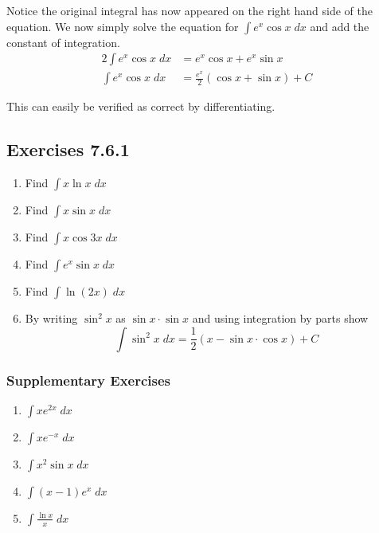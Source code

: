 Notice the original integral has now appeared on the right hand side of the equation. We
now simply solve the equation for $\int e^{x} \cos  x\; d x$ and add the constant of integration.
\begin{align*}2 \int e^{x} \cos  x\; d x &  = e^{x} \cos  x +e^{x} \sin  x \\
\int e^{x} \cos  x\; d x &  = \frac{e^{x}}{2} \left (\cos  x +\sin  x\right ) +C\end{align*}

This can easily be verified as correct by differentiating. 

\subsection{Exercises 7.6.1}
\begin{enumerate}
\item Find $\int x \ln  x\; d x$ 

\item Find $\int x \sin  x\; d x$ 

\item Find $\int x \cos  3 x\; d x$ 

\item Find $\int e^{x} \sin  x\; d x$ 

\item Find $\int \ln  \left (2 x\right )\; d x$ 

\item By writing $\sin ^{2} x$ as $\sin  x \cdot \sin  x$ and using integration by parts show
\begin{equation*}\int \sin ^{2} x\; d x =\frac{1}{2} \left (x -\sin  x \cdot \cos  x\right ) +C
\end{equation*}\end{enumerate}


\subsubsection{Supplementary Exercises}
\begin{enumerate}
\item $\int x e^{2 x}\; d x$ 

\item $\int x e^{ -x}\; d x$ 

\item $\int x^{2} \sin  x\; d x$ 

\item $\int \left (x -1\right ) e^{x}\; d x$ 

\item $\int \frac{\ln  x}{x}\; d x$ \end{enumerate}


